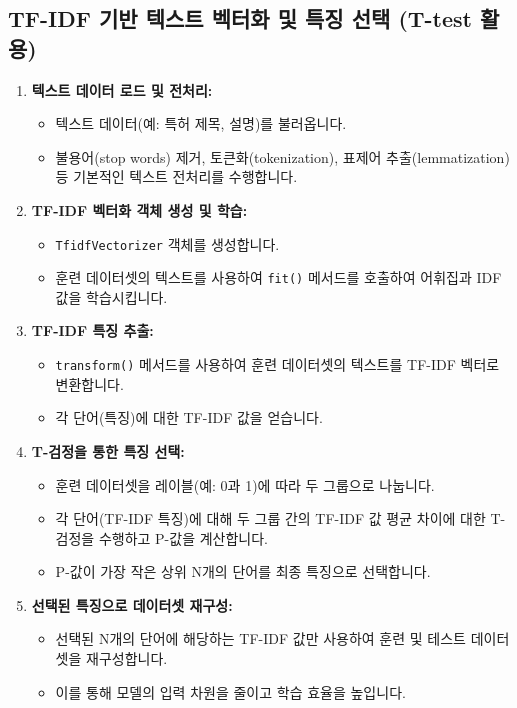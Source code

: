 \documentclass[11pt,a4paper]{article}
\theoremstyle{definition}
\begin{document}
\subsection{TF-IDF 기반 텍스트 벡터화 및 특징 선택 (T-test 활용)}
\begin{enumerate}
    \item \textbf{텍스트 데이터 로드 및 전처리:}
    \begin{itemize}
        \item 텍스트 데이터(예: 특허 제목, 설명)를 불러옵니다.
        \item 불용어(stop words) 제거, 토큰화(tokenization), 표제어 추출(lemmatization) 등 기본적인 텍스트 전처리를 수행합니다.
    \end{itemize}
    \item \textbf{TF-IDF 벡터화 객체 생성 및 학습:}
    \begin{itemize}
        \item \texttt{TfidfVectorizer} 객체를 생성합니다.
        \item 훈련 데이터셋의 텍스트를 사용하여 \texttt{fit()} 메서드를 호출하여 어휘집과 IDF 값을 학습시킵니다.
    \end{itemize}
    \item \textbf{TF-IDF 특징 추출:}
    \begin{itemize}
        \item \texttt{transform()} 메서드를 사용하여 훈련 데이터셋의 텍스트를 TF-IDF 벡터로 변환합니다.
        \item 각 단어(특징)에 대한 TF-IDF 값을 얻습니다.
    \end{itemize}
    \item \textbf{T-검정을 통한 특징 선택:}
    \begin{itemize}
        \item 훈련 데이터셋을 레이블(예: 0과 1)에 따라 두 그룹으로 나눕니다.
        \item 각 단어(TF-IDF 특징)에 대해 두 그룹 간의 TF-IDF 값 평균 차이에 대한 T-검정을 수행하고 P-값을 계산합니다.
        \item P-값이 가장 작은 상위 N개의 단어를 최종 특징으로 선택합니다.
    \end{itemize}
    \item \textbf{선택된 특징으로 데이터셋 재구성:}
    \begin{itemize}
        \item 선택된 N개의 단어에 해당하는 TF-IDF 값만 사용하여 훈련 및 테스트 데이터셋을 재구성합니다.
        \item 이를 통해 모델의 입력 차원을 줄이고 학습 효율을 높입니다.
    \end{itemize}
\end{enumerate}
\end{document}
